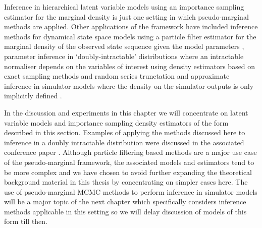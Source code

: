 Inference in hierarchical latent variable models using an importance sampling estimator for the marginal density is just one setting in which pseudo-marginal methods are applied. Other applications of the framework have included inference methods for dynamical state space models using a particle filter estimator \citep{doucet2001sequential,gordon1993novel} for the marginal density of the observed state sequence given the model parameters \citep{pitt2010auxiliary,chopin2015particle,andrieu2010particle}, parameter inference in `doubly-intractable' distributions \citep{murray2006mcmc} where an intractable normaliser depends on the variables of interest using density estimators based on exact sampling methods \citep{propp1996exact,moller2006efficient,murray2007advances} and random series trunctation \citep{lyne2015russian} and approximate inference in simulator models where the density on the simulator outputs is only implicitly defined \citep{marjoram2003markov}. 

In the discussion and experiments in this chapter we will concentrate on latent variable models and importance sampling density estimators of the form described in this section. Examples of applying the methods discussed here to inference in a doubly intractable distribution were discussed in the associated conference paper \citep{murray2016pseudo}. Although particle filtering based methods are a major use case of the pseudo-marginal framework, the associated models and estimators tend to be more complex and we have chosen to avoid further expanding the theoretical background material in this thesis by concentrating on simpler cases here. The use of pseudo-marginal \ac{MCMC} methods to perform inference in simulator models will be a major topic of the next chapter which specifically considers inference methods applicable in this setting so we will delay discussion of models of this form till then.

